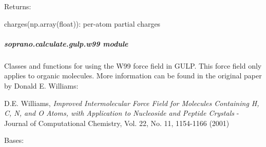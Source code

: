 \documentclass[letterpaper,10pt,english]{sphinxmanual}
\begin{document}
\begin{fulllineitems}
\begin{DUlineblock}{0em}
\item[] Returns:
\item[]
\begin{DUlineblock}{\DUlineblockindent}
\item[] charges(np.array(float)): per-atom partial charges
\end{DUlineblock}
\end{DUlineblock}

\end{fulllineitems}



\subparagraph{soprano.calculate.gulp.w99 module}
\label{doctree/soprano.calculate.gulp.w99:soprano-calculate-gulp-w99-module}\label{doctree/soprano.calculate.gulp.w99:module-soprano.calculate.gulp.w99}\label{doctree/soprano.calculate.gulp.w99::doc}
Classes and functions for using the W99 force field in GULP.
This force field only applies to organic molecules. More information can be
found in the original paper by Donald E. Williams:

D.E. Williams,
\emph{Improved Intermolecular Force Field for Molecules Containing H, C, N, and O
Atoms, with Application to Nucleoside and Peptide Crystals}  - Journal
of Computational Chemistry, Vol. 22, No. 11, 1154-1166 (2001)

\begin{fulllineitems}
\label{doctree/soprano.calculate.gulp.w99:soprano.calculate.gulp.w99.W99Error}
Bases: 

\end{fulllineitems}

\end{document}
